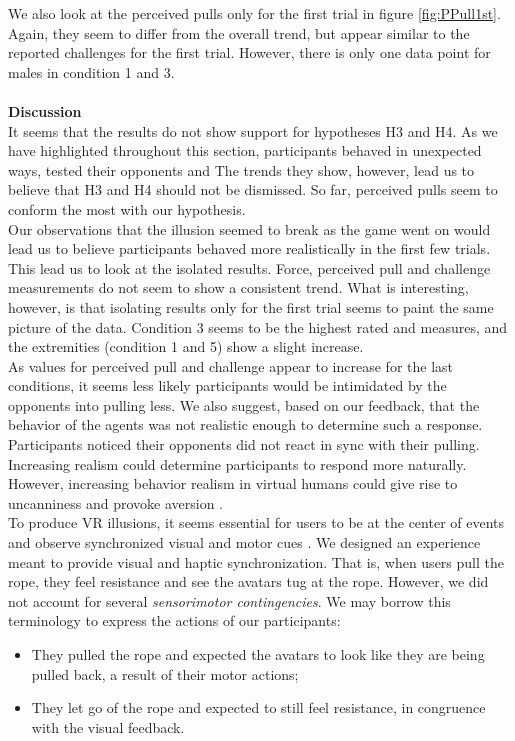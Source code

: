 We also look at the perceived pulls only for the first trial in figure \ref{fig:PPull1st}. Again, they seem to differ from the overall trend, but appear similar to the reported challenges for the first trial. However, there is only one data point for males in condition 1 and 3.
\\
\\
\textbf{Discussion}\\
It seems that the results do not show support for hypotheses H3 and H4. As we have highlighted throughout this section, participants behaved in unexpected ways, tested their opponents and  The trends they show, however, lead us to believe that H3 and H4 should not be dismissed. So far, perceived pulls seem to conform the most with our hypothesis.
\\
Our observations that the illusion seemed to break as the game went on would lead us to believe participants behaved more realistically in the first few trials. This lead us to look at the isolated results. 
Force, perceived pull and challenge measurements do not seem to show a consistent trend. What is interesting, however, is that isolating results only for the first trial seems to paint the same picture of the data. Condition 3 seems to be the highest rated and measures, and the extremities (condition 1 and 5) show a slight increase.
\\
As values for perceived pull and challenge appear to increase for the last conditions, it seems less likely participants would be intimidated by the opponents into pulling less. We also suggest, based on our feedback, that the behavior of the agents was not realistic enough to determine such a response. Participants noticed their opponents did not react in sync with their pulling. Increasing realism could determine participants to respond more naturally.  However, increasing behavior realism in virtual humans could give rise to uncanniness and provoke aversion \cite{brenton2005uncanny,stein2019stay}. 
\\
To produce VR illusions, it seems essential for users to be at the center of events and observe synchronized visual and motor cues \cite{slater2009inducing}. We designed an experience meant to provide visual and haptic synchronization. That is, when users pull the rope, they feel resistance and see the avatars tug at the rope. However, we did not account for several \textit{sensorimotor contingencies}. We may borrow this terminology to express the actions of our participants: 
\begin{itemize}
\itemsep0em
\item They pulled the rope and expected the avatars to look like they are being pulled back, a result of their motor actions;
\item They let go of the rope and expected to still feel resistance, in congruence with the visual feedback.
\end{itemize}
